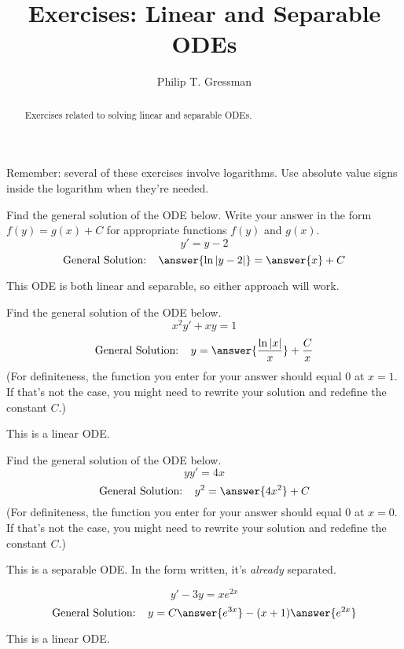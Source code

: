 \documentclass{ximera}
\title{Exercises: Linear and Separable ODEs}
\author{Philip T. Gressman}
\begin{document}
\begin{abstract}
Exercises related to solving linear and separable ODEs.
\end{abstract}
\maketitle


Remember: several of these exercises involve logarithms. Use absolute value signs inside the logarithm when they're needed.

\begin{exercise}%
Find the general solution of the ODE below. Write your answer in the form $f(y) = g(x) + C$ for appropriate functions $f(y)$ and $g(x)$.
\[ y' = y - 2 \]
\[ \text{General Solution: } \ \ \answer{\ln |y-2|} = \answer{x} + C \]
\begin{hint}
This ODE is both linear and separable, so either approach will work.
\end{hint}
\end{exercise}

\begin{exercise}%
Find the general solution of the ODE below.
\[ x^2 y' + xy = 1 \]
\[ \text{General Solution: } \ \  y = \answer{\frac{\ln |x|}{x}} + \frac{C}{x} \]
(For definiteness, the function you enter for your answer should equal $0$ at $x=1$. If that's not the case, you might need to rewrite your solution and redefine the constant $C$.)
\begin{hint}
This is a linear ODE.
\end{hint}
\end{exercise}

\begin{exercise}%
Find the general solution of the ODE below.
\[ y y' = 4x \]
\[ \text{General Solution: } \ \  y^2 =  \answer{4 x^2} + C \]
(For definiteness, the function you enter for your answer should equal $0$ at $x=0$. If that's not the case, you might need to rewrite your solution and redefine the constant $C$.)
\begin{hint}
This is a separable ODE. In the form written, it's \textit{already} separated.
\end{hint}
\end{exercise}

\begin{exercise}%
\[ y'-3y=xe^{2x} \]
\[ \text{General Solution: } \ \  y = C\answer{e^{3x}}-(x+1)\answer{e^{2x}} \]
\begin{hint}
This is a linear ODE.
\end{hint}
\end{exercise}
\end{document}
